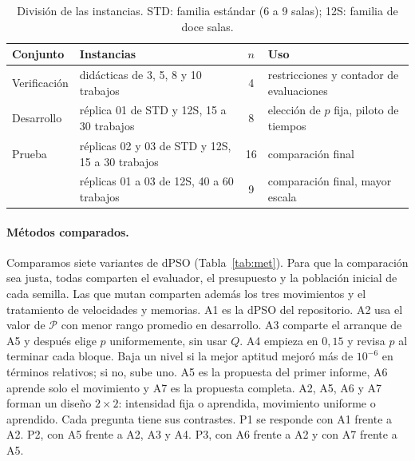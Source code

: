 \documentclass[10pt,a4paper]{article}
\newcommand{\dc}{{,}}%
\begin{document}
\begin{table}[htb]
\centering\small
\caption{División de las instancias. STD: familia estándar (6 a 9 salas); 12S: familia de doce salas.}
\label{tab:inst}
\begin{tabular}{@{}llcl@{}}
\toprule
Conjunto & Instancias & $n$ & Uso \\
\midrule
Verificación & didácticas de 3, 5, 8 y 10 trabajos & 4 & restricciones y contador de evaluaciones \\
Desarrollo & réplica 01 de STD y 12S, 15 a 30 trabajos & 8 & elección de $p$ fija, piloto de tiempos \\
Prueba & réplicas 02 y 03 de STD y 12S, 15 a 30 trabajos & 16 & comparación final \\
       & réplicas 01 a 03 de 12S, 40 a 60 trabajos & 9 & comparación final, mayor escala \\
\bottomrule
\end{tabular}
\end{table}

\paragraph{Métodos comparados.}
Comparamos siete variantes de dPSO (Tabla~\ref{tab:met}). Para que la comparación sea justa,
todas comparten el evaluador, el presupuesto y la población inicial de cada semilla. Las que
mutan comparten además los tres movimientos y el tratamiento de velocidades y memorias. A1 es
la dPSO del repositorio. A2 usa el valor de $\mathcal{P}$ con menor rango promedio en
desarrollo. A3 comparte el arranque de A5 y después elige $p$ uniformemente, sin usar $Q$. A4
empieza en $0\dc15$ y revisa $p$ al terminar cada bloque. Baja un nivel si la mejor aptitud
mejoró más de $10^{-6}$ en términos relativos; si no, sube uno. A5 es la propuesta del primer
informe, A6 aprende solo el movimiento y A7 es la propuesta completa. A2, A5, A6 y A7 forman un
diseño $2\times2$: intensidad fija o aprendida, movimiento uniforme o aprendido. Cada pregunta
tiene sus contrastes. P1 se responde con A1 frente a A2. P2, con A5 frente a A2, A3 y A4. P3,
con A6 frente a A2 y con A7 frente a A5.
\end{document}
